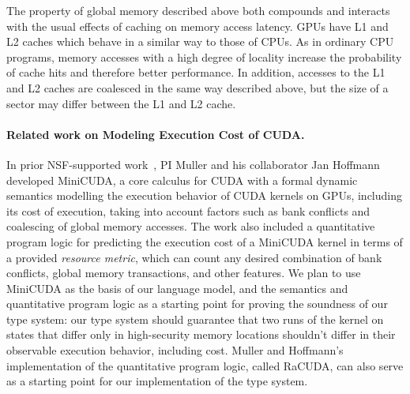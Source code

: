 The property of global memory described above both compounds and interacts with
the usual effects of caching on memory access latency.
%
GPUs have L1 and L2 caches which behave in a similar way to those of CPUs.
%
As in ordinary CPU programs, memory accesses with a high degree of locality increase the probability of cache hits and therefore better performance.
%
In addition, accesses to the L1 and L2 caches are coalesced in the same way described above, but the size of a sector may differ between the L1 and L2 cache.





\paragraph{Related work on Modeling Execution Cost of CUDA.}
In prior NSF-supported work~\cite{MullerHo21}, PI Muller and his collaborator Jan Hoffmann developed MiniCUDA, a core calculus for CUDA with a formal dynamic semantics modelling the execution behavior of CUDA kernels on GPUs, including its cost of execution, taking into account factors such as bank conflicts and coalescing of global memory accesses.
%
The work also included a quantitative program logic for predicting the execution cost of a MiniCUDA kernel in terms of a provided {\em resource metric}, which can count any desired combination of bank conflicts, global memory transactions, and other features.
%
We plan to use MiniCUDA as the basis of our language model, and the semantics and quantitative program logic as a starting point for proving the soundness of our type system: our type system should guarantee that two runs of the kernel on states that differ only in high-security memory locations shouldn't differ in their observable execution behavior, including cost.
%
Muller and Hoffmann's implementation of the quantitative program logic, called RaCUDA, can also serve as a starting point for our implementation of the type system.


